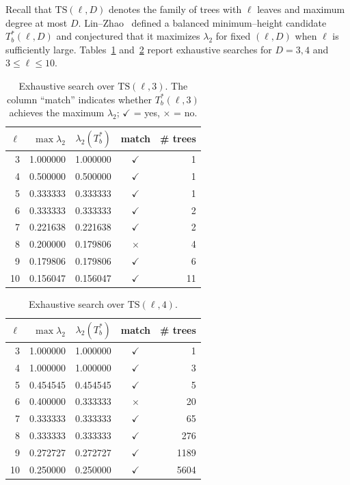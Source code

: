 \documentclass[11pt]{article}
\theoremstyle{definition}
\theoremstyle{remark}
\begin{document}
Recall that $\mathrm{TS}(\ell,D)$ denotes the family of trees with $\ell$ leaves and maximum degree at most $D$.
Lin--Zhao~\cite[Definition~3.5]{LinZhaoPlanar} defined a balanced minimum--height candidate $T_b^*(\ell,D)$ and conjectured that it maximizes $\lambda_2$ for fixed $(\ell,D)$ when $\ell$ is sufficiently large.
Tables~\ref{tab:TS3} and~\ref{tab:TS4} report exhaustive searches for $D=3,4$ and $3\le\ell\le 10$.

\begin{table}[ht]
\centering
\begin{tabular}{r r r c r}
\hline
$\ell$ & $\max\lambda_2$ & $\lambda_2(T_b^*)$ & match & \# trees\\
\hline
3  & 1.000000 & 1.000000 & $\checkmark$ & 1 \\
4  & 0.500000 & 0.500000 & $\checkmark$ & 1 \\
5  & 0.333333 & 0.333333 & $\checkmark$ & 1 \\
6  & 0.333333 & 0.333333 & $\checkmark$ & 2 \\
7  & 0.221638 & 0.221638 & $\checkmark$ & 2 \\
8  & 0.200000 & 0.179806 & $\times$     & 4 \\
9  & 0.179806 & 0.179806 & $\checkmark$ & 6 \\
10 & 0.156047 & 0.156047 & $\checkmark$ & 11 \\
\hline
\end{tabular}
\caption{Exhaustive search over $\mathrm{TS}(\ell,3)$. The column ``match'' indicates whether $T_b^*(\ell,3)$ achieves the maximum $\lambda_2$; $\checkmark$ = yes, $\times$ = no.}
\label{tab:TS3}
\end{table}

\begin{table}[ht]
\centering
\begin{tabular}{r r r c r}
\hline
$\ell$ & $\max\lambda_2$ & $\lambda_2(T_b^*)$ & match & \# trees\\
\hline
3  & 1.000000 & 1.000000 & $\checkmark$ & 1 \\
4  & 1.000000 & 1.000000 & $\checkmark$ & 3 \\
5  & 0.454545 & 0.454545 & $\checkmark$ & 5 \\
6  & 0.400000 & 0.333333 & $\times$     & 20 \\
7  & 0.333333 & 0.333333 & $\checkmark$ & 65 \\
8  & 0.333333 & 0.333333 & $\checkmark$ & 276 \\
9  & 0.272727 & 0.272727 & $\checkmark$ & 1189 \\
10 & 0.250000 & 0.250000 & $\checkmark$ & 5604 \\
\hline
\end{tabular}
\caption{Exhaustive search over $\mathrm{TS}(\ell,4)$.}
\label{tab:TS4}
\end{table}
\end{document}
